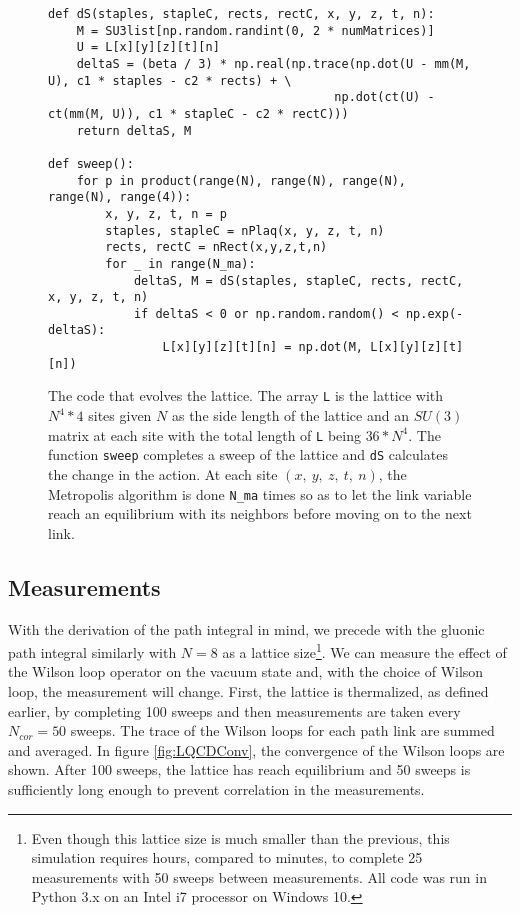 \documentclass[11pt]{article}
\begin{document}
\begin{figure}[h]
\begin{lstlisting}
def dS(staples, stapleC, rects, rectC, x, y, z, t, n):
    M = SU3list[np.random.randint(0, 2 * numMatrices)]
    U = L[x][y][z][t][n]
    deltaS = (beta / 3) * np.real(np.trace(np.dot(U - mm(M, U), c1 * staples - c2 * rects) + \
                                        np.dot(ct(U) - ct(mm(M, U)), c1 * stapleC - c2 * rectC)))             
    return deltaS, M

def sweep():
    for p in product(range(N), range(N), range(N), range(N), range(4)):
        x, y, z, t, n = p
        staples, stapleC = nPlaq(x, y, z, t, n)
        rects, rectC = nRect(x,y,z,t,n)
        for _ in range(N_ma):
            deltaS, M = dS(staples, stapleC, rects, rectC, x, y, z, t, n)
            if deltaS < 0 or np.random.random() < np.exp(-deltaS):
                L[x][y][z][t][n] = np.dot(M, L[x][y][z][t][n])
\end{lstlisting}
\caption{The code that evolves the lattice. The array \texttt{L} is the lattice with $N^4*4$ sites given $N$ as the side length of the lattice and an $SU(3)$ matrix at each site with the total length of \texttt{L} being $36*N^4$. The function \texttt{sweep} completes a sweep of the lattice and \texttt{dS} calculates the change in the action. At each site $(x,\ y,\ z,\ t,\ n)$, the Metropolis algorithm is done \texttt{N\_ma} times so as to let the link variable reach an equilibrium with its neighbors before moving on to the next link.}
\label{fig:LQCDSweep}
\end{figure}

\subsection{Measurements}
With the derivation of the path integral in mind, we precede with the gluonic path integral similarly with $N=8$ as a lattice size\footnote{Even though this lattice size is much smaller than the previous, this simulation requires hours, compared to minutes, to complete 25 measurements with 50 sweeps between measurements. All code was run in Python 3.x on an Intel i7 processor on Windows 10.}. We can measure the effect of the Wilson loop operator on the vacuum state and, with the choice of Wilson loop, the measurement will change. First, the lattice is thermalized, as defined earlier, by completing 100 sweeps and then measurements are taken every $N_{cor}=50$ sweeps. The trace of the Wilson loops for each path link are summed and averaged. In figure \ref{fig:LQCDConv}, the convergence of the Wilson loops are shown. After 100 sweeps, the lattice has reach equilibrium and 50 sweeps is sufficiently long enough to prevent correlation in the measurements.
\end{document}
